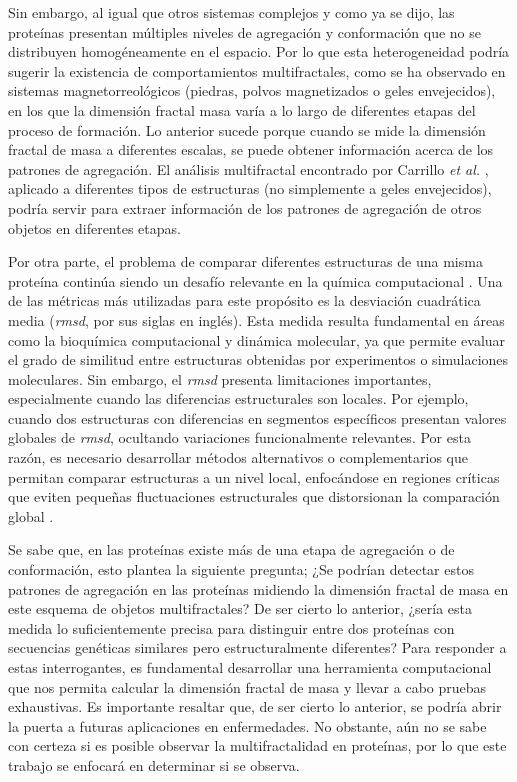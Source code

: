 Sin embargo, al igual que otros sistemas complejos y como ya se dijo, las proteínas  presentan m\'{u}ltiples niveles de agregaci\'{o}n y conformaci\'{o}n que no se distribuyen homog\'{e}neamente en el espacio. Por lo que esta heterogeneidad podr\'{i}a sugerir la existencia de comportamientos multifractales, como se ha observado en sistemas magnetorreol\'{o}gicos (piedras, polvos magnetizados o geles envejecidos), en los que la dimensi\'{o}n fractal masa var\'{i}a a lo largo de diferentes etapas del proceso de formaci\'{o}n. Lo anterior sucede porque cuando se mide la dimensi\'{o}n fractal de masa a diferentes escalas, se puede obtener informaci\'{o}n acerca de los patrones de agregaci\'{o}n. El an\'{a}lisis multifractal encontrado por Carrillo \textit{et al.} \cite{Carrillo2003}, aplicado a diferentes tipos de estructuras (no simplemente a geles envejecidos), podr\'{i}a servir para extraer informaci\'{o}n de los patrones de agregaci\'{o}n de otros objetos en diferentes etapas. 

Por otra parte, el problema de comparar diferentes estructuras de una misma prote\'{i}na contin\'{u}a siendo un desaf\'{i}o relevante en la qu\'{i}mica computacional \cite{Kufareva2012}. Una de las m\'{e}tricas m\'{a}s utilizadas para este prop\'{o}sito es la desviaci\'{o}n cuadr\'{a}tica media (\textit{rmsd}, por sus siglas en ingl\'{e}s). Esta medida resulta fundamental en \'{a}reas como la bioqu\'{i}mica computacional y dinámica molecular, ya que permite evaluar el grado de similitud entre estructuras obtenidas por experimentos o simulaciones moleculares. Sin embargo, el \textit{rmsd} presenta limitaciones importantes, especialmente cuando las diferencias estructurales son locales. Por ejemplo, cuando dos estructuras con diferencias en segmentos espec\'{i}ficos  presentan valores globales de \textit{rmsd}, ocultando variaciones funcionalmente relevantes. Por esta raz\'{o}n, es necesario desarrollar m\'{e}todos alternativos o complementarios que permitan comparar estructuras a un nivel local, enfoc\'{a}ndose en regiones cr\'{i}ticas que eviten pequeñas fluctuaciones estructurales que distorsionan la comparaci\'{o}n global \cite{Kufareva2012}.

Se sabe que, en las prote\'{i}nas existe m\'{a}s de una etapa de agregaci\'{o}n o de conformaci\'{o}n, esto plantea la siguiente pregunta; ¿Se podr\'{i}an detectar estos patrones de agregaci\'{o}n en las prote\'{i}nas midiendo la dimensi\'{o}n fractal de masa en este esquema de objetos multifractales? De ser cierto lo anterior, ¿ser\'{i}a esta medida lo suficientemente precisa para distinguir entre dos prote\'{i}nas con secuencias gen\'{e}ticas similares pero estructuralmente diferentes? Para responder a estas interrogantes, es fundamental desarrollar una herramienta computacional que nos permita calcular la dimensi\'{o}n fractal de masa y llevar a cabo pruebas exhaustivas. Es importante resaltar que, de ser cierto lo anterior, se podr\'{i}a abrir la puerta a futuras aplicaciones en enfermedades. No obstante, a\'{u}n no se sabe con certeza si es posible observar la multifractalidad en prote\'{i}nas, por lo que este trabajo se enfocar\'{a} en determinar si se observa.


